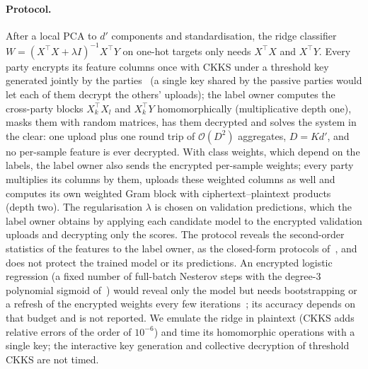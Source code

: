 \paragraph{Protocol.}
After a local PCA to $d'$ components and standardisation, the ridge classifier $W=(X^\top X+\lambda I)^{-1}X^\top Y$ on one-hot targets only needs $X^\top X$ and $X^\top Y$. Every party encrypts its feature columns once with CKKS under a threshold key generated jointly by the parties~\cite{mouchet2021multiparty} (a single key shared by the passive parties would let each of them decrypt the others' uploads); the label owner computes the cross-party blocks $X_k^\top X_l$ and $X_k^\top Y$ homomorphically (multiplicative depth one), masks them with random matrices, has them decrypted and solves the system in the clear: one upload plus one round trip of $\mathcal{O}(D^2)$ aggregates, $D=Kd'$, and no per-sample feature is ever decrypted. With class weights, which depend on the labels, the label owner also sends the encrypted per-sample weights; every party multiplies its columns by them, uploads these weighted columns as well and computes its own weighted Gram block with ciphertext--plaintext products (depth two). The regularisation $\lambda$ is chosen on validation predictions, which the label owner obtains by applying each candidate model to the encrypted validation uploads and decrypting only the scores. The protocol reveals the second-order statistics of the features to the label owner, as the closed-form protocols of~\cite{gascon2017privacy,huang2026vafl}, and does not protect the trained model or its predictions. An encrypted logistic regression (a fixed number of full-batch Nesterov steps with the degree-3 polynomial sigmoid of~\cite{kim2018logistic}) would reveal only the model but needs bootstrapping or a refresh of the encrypted weights every few iterations~\cite{kim2018logistic,han2019logistic}; its accuracy depends on that budget and is not reported. We emulate the ridge in plaintext (CKKS adds relative errors of the order of $10^{-6}$) and time its homomorphic operations with a single key; the interactive key generation and collective decryption of threshold CKKS are not timed.

